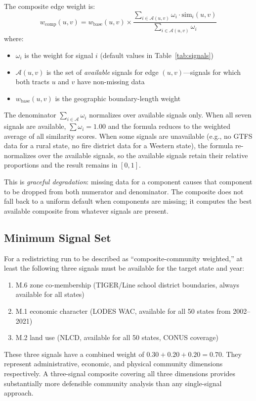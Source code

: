 The composite edge weight is:
\begin{equation}
  w_{\mathrm{comp}}(u, v)
  = w_{\mathrm{base}}(u, v) \times
    \frac{\displaystyle\sum_{i \in \mathcal{A}(u,v)} \omega_i \cdot \mathrm{sim}_i(u, v)}
         {\displaystyle\sum_{i \in \mathcal{A}(u,v)} \omega_i}
  \label{eq:composite}
\end{equation}
where:
\begin{itemize}
  \item $\omega_i$ is the weight for signal $i$ (default values in Table~\ref{tab:signals})
  \item $\mathcal{A}(u, v)$ is the set of \emph{available} signals for edge $(u, v)$---signals for which both tracts $u$ and $v$ have non-missing data
  \item $w_{\mathrm{base}}(u, v)$ is the geographic boundary-length weight
\end{itemize}

The denominator $\sum_{i \in \mathcal{A}} \omega_i$ normalizes over available
signals only.
When all seven signals are available, $\sum \omega_i = 1.00$ and the formula
reduces to the weighted average of all similarity scores.
When some signals are unavailable (e.g., no GTFS data for a rural state,
no fire district data for a Western state), the formula re-normalizes over
the available signals, so the available signals retain their relative
proportions and the result remains in $[0, 1]$.

This is \emph{graceful degradation}: missing data for a component causes
that component to be dropped from both numerator and denominator.
The composite does not fall back to a uniform default when components are
missing; it computes the best available composite from whatever signals
are present.

\subsection{Minimum Signal Set}

For a redistricting run to be described as ``composite-community weighted,''
at least the following three signals must be available for the target state
and year:
\begin{enumerate}
  \item M.6 zone co-membership (TIGER/Line school district boundaries, always
    available for all states)
  \item M.1 economic character (LODES WAC, available for all 50 states from
    2002--2021)
  \item M.2 land use (NLCD, available for all 50 states, CONUS coverage)
\end{enumerate}
These three signals have a combined weight of $0.30 + 0.20 + 0.20 = 0.70$.
They represent administrative, economic, and physical community dimensions
respectively.
A three-signal composite covering all three dimensions provides substantially
more defensible community analysis than any single-signal approach.

